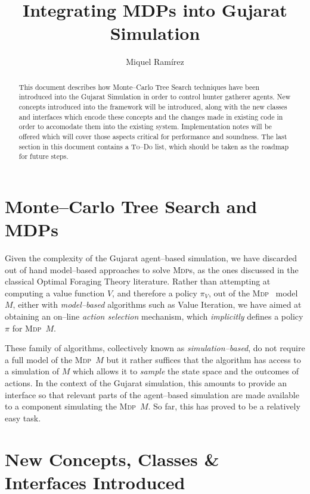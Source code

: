 \documentclass[a4paper,10pt]{article}
\title{Integrating MDPs into Gujarat Simulation}
\author{Miquel Ramírez}
\newcommand{\mdp}{\textsc{Mdp}}
\newcommand{\mdps}{\textsc{Mdp}s}
\begin{document}
\maketitle

\begin{abstract}
This document describes how Monte--Carlo Tree Search techniques have been introduced into
the Gujarat Simulation in order to control hunter gatherer agents. New concepts introduced
into the framework will be introduced, along with the new classes and interfaces which encode
these concepts and the changes made in existing code in order to accomodate them into the existing
system. Implementation notes will be offered which will cover those aspects critical
for performance and soundness. The last section in this document contains a \textsc{To--Do} list, which
should be taken as the roadmap for future steps.
\end{abstract}

\tableofcontents

\section{Monte--Carlo Tree Search and MDPs}

Given the complexity of the Gujarat agent--based simulation, we have discarded out of hand model--based approaches
to solve \mdps, as the ones discussed in the classical Optimal Foraging Theory literature. Rather than attempting
at computing a value function $V$, and therefore a policy $\pi_{V}$, out of the \mdp~ model $M$, either with 
\emph{model--based} algorithms such as Value Iteration, we have aimed at obtaining an on--line \emph{action selection} 
mechanism, which \emph{implicitly} defines a policy $\pi$ for \mdp~$M$.

These family of algorithms, collectively known as \emph{simulation--based}, do not require a full model of the \mdp~$M$
but it rather suffices that the algorithm has access to a simulation of $M$ which allows it to \emph{sample} the state
space and the outcomes of actions. In the context of the Gujarat simulation, this amounts to provide an interface so
that relevant parts of the agent--based simulation are made available to a component simulating the \mdp~$M$. So far,
this has proved to be a relatively easy task.

\section{New Concepts, Classes \& Interfaces Introduced}
\end{document}
